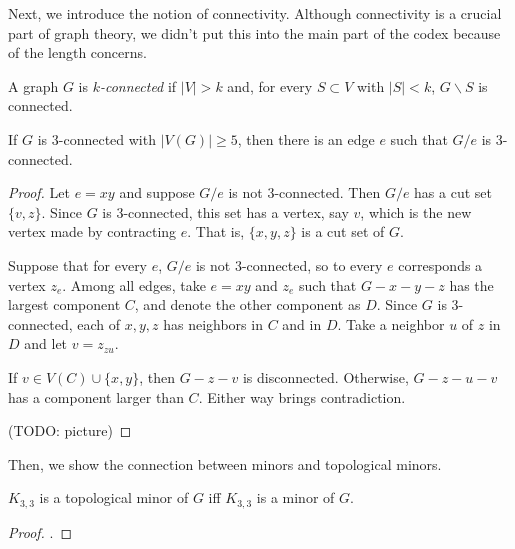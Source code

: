         Next, we introduce the notion of connectivity. Although connectivity is a crucial part of graph theory, we didn't put this into the main part of the codex because of the length concerns.
    
        \begin{defn}[Connectivity] \label{def_connectivity}
            A graph $G$ is \emph{$k$-connected} if $|V| > k$ and, for every $S \subset V$ with $|S| < k$, $G \backslash S$ is connected.
        \end{defn}
        
        \begin{thm} \label{thm_3conn}
            If $G$ is 3-connected with $|V(G)| \geq 5$, then there is an edge $e$ such that $G/e$ is 3-connected.
        \end{thm}
        
        \begin{proof}
            Let $e=xy$ and suppose $G/e$ is not 3-connected. Then $G/e$ has a cut set $\{v, z\}$. Since $G$ is 3-connected, this set has a vertex, say $v$, which is the new vertex made by contracting $e$. That is, $\{x, y, z\}$ is a cut set of $G$.
            
            Suppose that for every $e$, $G/e$ is not 3-connected, so to every $e$ corresponds a vertex $z_e$. Among all edges, take $e=xy$ and $z_e$ such that $G-x-y-z$ has the largest component $C$, and denote the other component as $D$. Since $G$ is 3-connected, each of $x,y,z$ has neighbors in $C$ and in $D$. Take a neighbor $u$ of $z$ in $D$ and let $v=z_{zu}$.
            
            If $v \in V(C) \cup \{x,y\}$, then $G-z-v$ is disconnected. Otherwise, $G-z-u-v$ has a component larger than $C$. Either way brings contradiction.
            
            (TODO: picture)
        \end{proof}
        
        Then, we show the connection between minors and topological minors.
        
        \begin{lemma} \label{lem_minor}
            $K_{3,3}$ is a topological minor of $G$ iff $K_{3,3}$ is a minor of $G$.
        \end{lemma}
        
        \begin{proof}
            .
        \end{proof}
        

